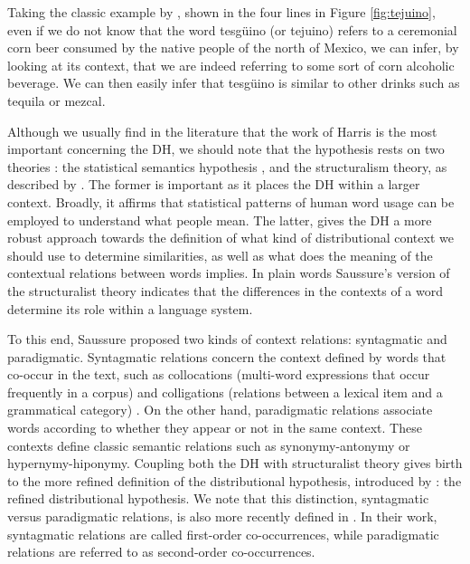 Taking the classic example by \cite{nida1979componential}, shown in the four lines  in Figure \ref{fig:tejuino}, even if we do not know that the word tesg\"{u}ino (or tejuino) refers to a ceremonial corn beer consumed by the native people of the north of Mexico, we can infer, by looking at its context, that we are indeed referring to some sort of corn alcoholic beverage. We can then easily infer that tesg\"{u}ino is similar to other drinks such as tequila or mezcal.



Although we usually find in the literature that the work of Harris is the most important concerning the DH, we should note that the hypothesis rests on two theories  \cite{sahlgren2008distributional,turney2010}: the statistical semantics hypothesis \cite{booth1955machine}, and the  structuralism theory, as described by \cite{de1916course}. The former is important as it places the DH within a larger context. Broadly, it affirms that statistical patterns of human word usage can be employed to understand what people mean. The latter,  gives the DH a more robust approach towards the definition of what kind of distributional context  we should use to determine similarities, as well as what does the meaning of the contextual relations between words implies. In plain words Saussure's version of the structuralist theory indicates that the differences in the contexts of a word determine its role within a language system. 

To this end, Saussure proposed two kinds of context relations: syntagmatic and paradigmatic. Syntagmatic relations concern the context defined by words that co-occur in the text, such as collocations (multi-word expressions that occur frequently in a corpus) and colligations (relations between a lexical item and a grammatical category) \cite{verschueren2015handbook}. On the other hand, paradigmatic relations associate words according to whether they appear or not in the same context. These contexts define classic semantic relations such as synonymy-antonymy or hypernymy-hiponymy. Coupling both the DH with structuralist theory gives birth to the more refined definition of the distributional hypothesis, introduced by \cite{sahlgren2008distributional}: the refined distributional hypothesis. We note that this distinction, syntagmatic versus paradigmatic relations, is also more recently defined in \cite{schutze1993vector}. In their work, syntagmatic relations are called first-order co-occurrences, while paradigmatic relations  are referred to as second-order co-occurrences.

